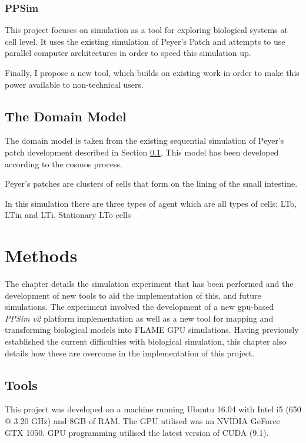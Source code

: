 \documentclass{UoYCSproject}
\begin{document}
\subsection{PPSim}
\label{ppsim}
This project focuses on simulation as a tool for exploring biological systems at cell level.
It uses the existing simulation of Peyer's Patch\cite{kieran_thesis} and attempts to use parallel computer architectures in order to speed this simulation up.

Finally, I propose a new tool, which builds on existing work in order to make this power available to non-technical users.

\section{The Domain Model}
The domain model is taken from the existing sequential simulation of Peyer's patch development described in Section \ref{ppsim}.
This model has been developed according to the \acrshort{cosmos} process\cite{cosmos}.

Peyer's patches are clusters of cells that form on the lining of the small intestine.

In this simulation there are three types of agent which are all types of cells; \gls{LTo}, \gls{LTin} and \gls{LTi}.
Stationary \gls{LTo} cells 

\chapter{Methods}
\label{methods}

The chapter details the simulation experiment that has been performed and the development of new tools to aid the implementation of this, and future simulations.
The experiment involved the development of a new \acrshort{gpu}-based \textit{PPSim v2} platform implementation as well as a new tool for mapping and transforming biological models into \gls{FLAME GPU} simulations.
Having previously established the current difficulties with biological simulation, this chapter also details how these are overcome in the implementation of this project.

\section{Tools}
This project was developed on a machine running Ubuntu 16.04 with Intel i5 (650 @ 3.20 GHz) and 8GB of RAM.
The GPU utilised was an NVIDIA GeForce GTX 1050.
GPU programming utilised the latest version of CUDA (9.1).
\end{document}
